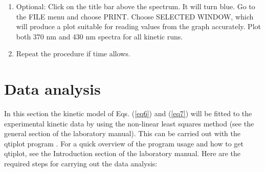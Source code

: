 \documentclass[byrevtex,amssymb,aps,pra,floatfix,letterpaper]{revtex4}
\begin{document}
\begin{enumerate}
\item Optional: Click on the title bar above the spectrum. It will turn blue. Go to the FILE menu and choose PRINT. Choose SELECTED WINDOW, which will produce a plot suitable for reading values from the graph accurately. Plot both 370 nm and 430 nm spectra for all kinetic runs.

\item Repeat the procedure if time allows.

\end{enumerate}

\section{Data analysis}

In this section the kinetic model of Eqs. (\ref{eq6}) and (\ref{eq7}) will be fitted to the experimental kinetic data by using the non-linear least squares method (see the general section of the laboratory manual). This can be carried out with the qtiplot program \cite{qtiplot}. For a quick overview of the program usage and how to get qtiplot, see the Introduction section of the laboratory manual. Here are the required steps for carrying out the data analysis:
\end{document}
